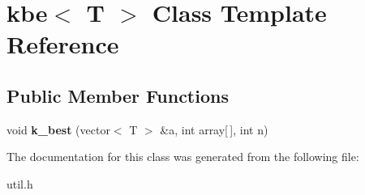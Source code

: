 \hypertarget{classkbe}{}\section{kbe$<$ T $>$ Class Template Reference}
\label{classkbe}
\subsection*{Public Member Functions}
\begin{DoxyCompactItemize}
\item 
void {\bfseries k\+\_\+best} (vector$<$ T $>$ \&a, int array\mbox{[}$\,$\mbox{]}, int n)\hypertarget{classkbe_a30bdbb2add91b3dcdcf329ae1ceea11e}{}\label{classkbe_a30bdbb2add91b3dcdcf329ae1ceea11e}

\end{DoxyCompactItemize}


The documentation for this class was generated from the following file\+:\begin{DoxyCompactItemize}
\item 
util.\+h\end{DoxyCompactItemize}

